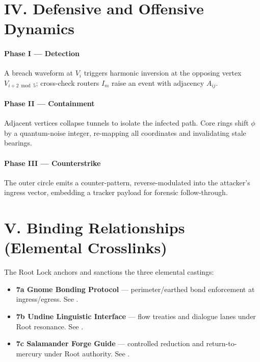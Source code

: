 \section*{IV. Defensive and Offensive Dynamics}
\paragraph{Phase I — Detection}
A breach waveform at $V_i$ triggers harmonic inversion at the opposing vertex $V_{i+2 \bmod 5}$; cross-check routers $I_m$ raise an event with adjacency $A_{ij}$.

\paragraph{Phase II — Containment}
Adjacent vertices collapse tunnels to isolate the infected path. Core rings shift $\phi$ by a quantum-noise integer, re-mapping all coordinates and invalidating stale bearings.

\paragraph{Phase III — Counterstrike}
The outer circle emits a counter-pattern, reverse-modulated into the attacker’s ingress vector, embedding a tracker payload for forensic follow-through.

\section*{V. Binding Relationships (Elemental Crosslinks)}
The Root Lock anchors and sanctions the three elemental castings:
\begin{itemize}
  \item \textbf{7a Gnome Bonding Protocol} — perimeter/earthed bond enforcement at ingress/egress. See .
  \item \textbf{7b Undine Linguistic Interface} — flow treaties and dialogue lanes under Root resonance. See .
  \item \textbf{7c Salamander Forge Guide} — controlled reduction and return-to-mercury under Root authority. See .
\end{itemize}

